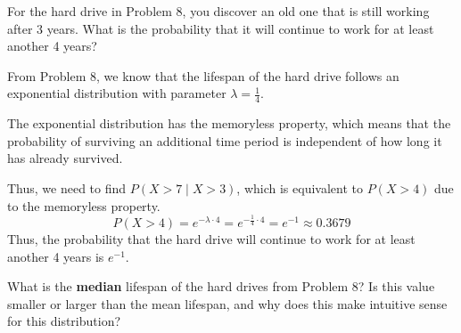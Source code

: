 \documentclass[a4paper, 10pt]{article}
\begin{document}
\begin{tosubmit}
\problem
For the hard drive in Problem 8, you discover an old one that is still working after 3 years.
What is the probability that it will continue to work for at least another 4 years?

\par\noindent\submitsolution
From Problem 8, we know that the lifespan of the hard drive follows an exponential distribution with parameter \( \lambda = \frac{1}{4} \).

\vspace{2mm}

The exponential distribution has the memoryless property, which means that the probability of surviving an additional time period is independent of how long it has already survived.

\vspace{2mm}

Thus, we need to find \( P(X > 7 \mid X > 3) \), which is equivalent to \( P(X > 4) \) due to the memoryless property.
\[ P(X > 4) = e^{-\lambda \cdot 4} = e^{-\frac{1}{4} \cdot 4} = e^{-1} \approx 0.3679 \]
Thus, the probability that the hard drive will continue to work for at least another 4 years is \( \boxed{e^{-1}} \).
\end{tosubmit}


\begin{problem}
What is the \textbf{median} lifespan of the hard drives from Problem 8?
Is this value smaller or larger than the mean lifespan, and why does this make intuitive sense for this distribution?
\end{problem}
\end{document}
